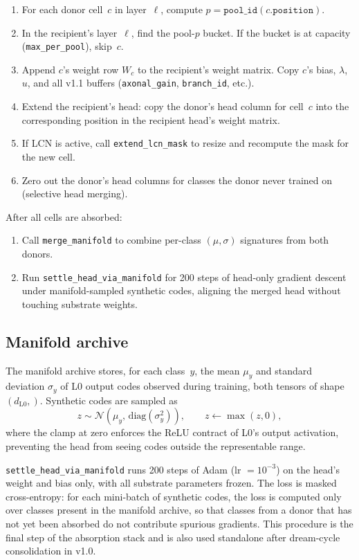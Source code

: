 \documentclass[11pt]{article}
\begin{document}
\begin{enumerate}[nosep]
  \item For each donor cell~$c$ in layer~$\ell$, compute
    $p = \texttt{pool\_id}(c.\texttt{position})$.
  \item In the recipient's layer~$\ell$, find the pool-$p$ bucket.
    If the bucket is at capacity (\texttt{max\_per\_pool}), skip~$c$.
  \item Append $c$'s weight row $W_c$ to the recipient's weight matrix.
    Copy $c$'s bias, $\lambda$, $u$, and all v1.1 buffers
    (\texttt{axonal\_gain}, \texttt{branch\_id}, etc.).
  \item Extend the recipient's head: copy the donor's head column for
    cell~$c$ into the corresponding position in the recipient head's
    weight matrix.
  \item If LCN is active, call \texttt{extend\_lcn\_mask} to resize and
    recompute the mask for the new cell.
  \item Zero out the donor's head columns for classes the donor never
    trained on (selective head merging).
\end{enumerate}

After all cells are absorbed:
\begin{enumerate}
  \item Call \texttt{merge\_manifold} to combine per-class $(\mu,\sigma)$
    signatures from both donors.
  \item Run \texttt{settle\_head\_via\_manifold} for 200 steps of
    head-only gradient descent under manifold-sampled synthetic codes,
    aligning the merged head without touching substrate weights.
\end{enumerate}

\subsection{Manifold archive}
\label{sec:detail-manifold}

The manifold archive stores, for each class~$y$, the mean $\mu_y$ and
standard deviation $\sigma_y$ of L0 output codes observed during
training, both tensors of shape $(d_{\text{L0}},)$.
Synthetic codes are sampled as
\[
  z \sim \mathcal{N}(\mu_y, \,\mathrm{diag}(\sigma_y^2)),
  \qquad z \leftarrow \max(z, 0),
\]
where the clamp at zero enforces the ReLU contract of L0's output
activation, preventing the head from seeing codes outside the
representable range.

\texttt{settle\_head\_via\_manifold} runs 200 steps of Adam
(lr $= 10^{-3}$) on the head's weight and bias only, with all
substrate parameters frozen.
The loss is masked cross-entropy: for each mini-batch of synthetic
codes, the loss is computed only over classes present in the manifold
archive, so that classes from a donor that has not yet been absorbed do
not contribute spurious gradients.
This procedure is the final step of the absorption stack and is also
used standalone after dream-cycle consolidation in v1.0.
\end{document}
